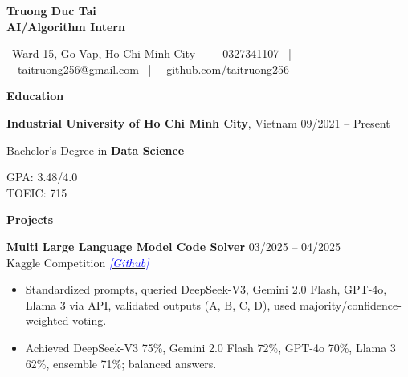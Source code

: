 \documentclass[10pt]{article}
\begin{document}
\begin{center}
    {\large \textbf{Truong Duc Tai}} \\
    \textbf{AI/Algorithm Intern}
\end{center}

\begin{center}
    \scriptsize
    \faMapMarker \ Ward 15, Go Vap, Ho Chi Minh City \ | \ 
    \faPhone \ 0327341107 \ | \ 
    \faEnvelope \ \href{mailto:taitruong256@gmail.com}{taitruong256@gmail.com} \ | \ 
    \faGithub \ \href{https://github.com/taitruong256}{github.com/taitruong256}
\end{center}

\begin{center}
    \vspace{0.05cm}
    \hrulefill
    \vspace{0.05cm}
\end{center}

\begin{center}
    \textbf{Education}
\end{center}

\textbf{Industrial University of Ho Chi Minh City}, Vietnam \hfill 09/2021 -- Present \\
\begin{minipage}[t]{0.65\textwidth}
    Bachelor’s Degree in \textbf{Data Science}
\end{minipage}%
\begin{minipage}[t]{0.35\textwidth}
    \raggedleft
    GPA: 3.48/4.0 \\
    TOEIC: 715
\end{minipage}

\begin{center}
    \vspace{0.05cm}
    \hrulefill
    \vspace{0.05cm}
\end{center}

\begin{center}
    \textbf{Projects}
\end{center}

\textbf{Multi Large Language Model Code Solver} \hfill 03/2025 -- 04/2025 \\
Kaggle Competition \hfill \href{https://github.com/taitruong256/CodeMMLU}{\textcolor{blue}{\textit{[Github]}}}

\begin{itemize}[noitemsep, topsep=0pt, partopsep=0pt, parsep=0pt]
    \item Standardized prompts, queried DeepSeek-V3, Gemini 2.0 Flash, GPT-4o, Llama 3 via API, validated outputs (A, B, C, D), used majority/confidence-weighted voting.
    \item Achieved DeepSeek-V3 75\%, Gemini 2.0 Flash 72\%, GPT-4o 70\%, Llama 3 62\%, ensemble 71\%; balanced answers.
\end{itemize}
\end{document}
